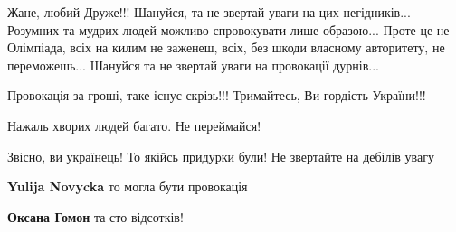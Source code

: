 \begin{itemize}
Жане, любий Друже!!! Шануйся, та не звертай уваги на цих негідників... Розумних
та мудрих людей можливо спровокувати лише образою... Проте це не Олімпіада, всіх
на килим не заженеш, всіх, без шкоди власному авторитету, не переможешь...
Шануйся та не звертай уваги на провокації дурнів... 🙏🤝


 
Провокація за гроші, таке існує скрізь!!! Тримайтесь, Ви гордість України!!!

 
Нажаль хворих людей багато.
Не переймайся!

 
Звісно, ви українець! То якійсь придурки були! Не звертайте на дебілів увагу

\begin{itemize}
 
\textbf{Yulija Novycka} то могла бути провокація

 
\textbf{Оксана Гомон} та сто відсотків!
\end{itemize}



\end{itemize}
